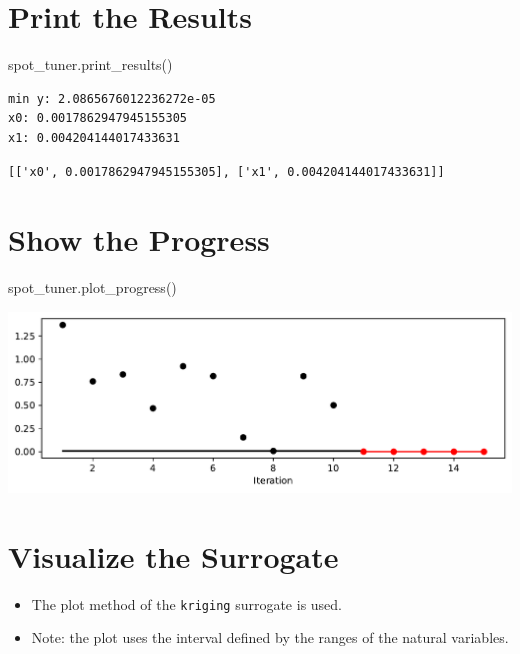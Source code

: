 \documentclass[
  letterpaper,
  DIV=11,
  numbers=noendperiod]{scrreprt}
\newenvironment{Shaded}{\begin{snugshade}}{\end{snugshade}}
\newcommand{\NormalTok}[1]{\textcolor[rgb]{0.00,0.23,0.31}{#1}}
\providecommand{\tightlist}{%
  \setlength{\itemsep}{0pt}\setlength{\parskip}{0pt}}\usepackage{longtable,booktabs,array}
\begin{document}
\section{Print the Results}\label{print-the-results-5}

\begin{Shaded}
\begin{Highlighting}[]
\NormalTok{spot\_tuner.print\_results()}
\end{Highlighting}
\end{Shaded}

\begin{verbatim}
min y: 2.0865676012236272e-05
x0: 0.0017862947945155305
x1: 0.004204144017433631
\end{verbatim}

\begin{verbatim}
[['x0', 0.0017862947945155305], ['x1', 0.004204144017433631]]
\end{verbatim}

\section{Show the Progress}\label{show-the-progress-2}

\begin{Shaded}
\begin{Highlighting}[]
\NormalTok{spot\_tuner.plot\_progress()}
\end{Highlighting}
\end{Shaded}

\includegraphics{a_04_spot_doc_files/figure-pdf/cell-11-output-1.pdf}

\section{Visualize the Surrogate}\label{visualize-the-surrogate}

\begin{itemize}
\tightlist
\item
  The plot method of the \texttt{kriging} surrogate is used.
\item
  Note: the plot uses the interval defined by the ranges of the natural
  variables.
\end{itemize}
\end{document}
